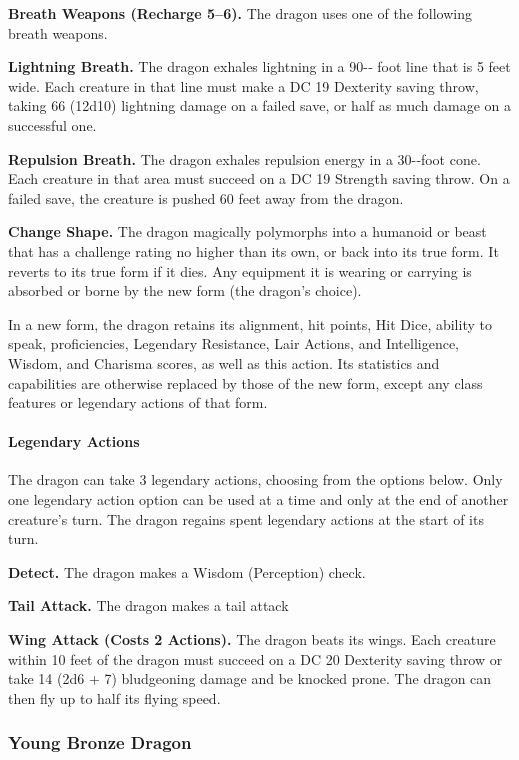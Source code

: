\documentclass[
]{article}
\begin{document}
\textbf{Breath Weapons (Recharge 5--6).} The dragon uses one of the
following breath weapons.

\textbf{Lightning Breath.} The dragon exhales lightning in a 90-­‐ foot
line that is 5 feet wide. Each creature in that line must make a DC 19
Dexterity saving throw, taking 66 (12d10) lightning damage on a failed
save, or half as much damage on a successful one.

\textbf{Repulsion Breath.} The dragon exhales repulsion energy in a
30-­‐foot cone. Each creature in that area must succeed on a DC 19
Strength saving throw. On a failed save, the creature is pushed 60 feet
away from the dragon.

\textbf{Change Shape.} The dragon magically polymorphs into a humanoid
or beast that has a challenge rating no higher than its own, or back
into its true form. It reverts to its true form if it dies. Any
equipment it is wearing or carrying is absorbed or borne by the new form
(the dragon's choice).

In a new form, the dragon retains its alignment, hit points, Hit Dice,
ability to speak, proficiencies, Legendary Resistance, Lair Actions, and
Intelligence, Wisdom, and Charisma scores, as well as this action. Its
statistics and capabilities are otherwise replaced by those of the new
form, except any class features or legendary actions of that form.

\hypertarget{legendary-actions-13}{%
\paragraph{Legendary Actions}\label{legendary-actions-13}}

The dragon can take 3 legendary actions, choosing from the options
below. Only one legendary action option can be used at a time and only
at the end of another creature's turn. The dragon regains spent
legendary actions at the start of its turn.

\textbf{Detect.} The dragon makes a Wisdom (Perception) check.

\textbf{Tail Attack.} The dragon makes a tail attack

\textbf{Wing Attack (Costs 2 Actions).} The dragon beats its wings. Each
creature within 10 feet of the dragon must succeed on a DC 20 Dexterity
saving throw or take 14 (2d6 + 7) bludgeoning damage and be knocked
prone. The dragon can then fly up to half its flying speed.

\hypertarget{young-bronze-dragon}{%
\subsubsection{Young Bronze Dragon}\label{young-bronze-dragon}}
\end{document}
